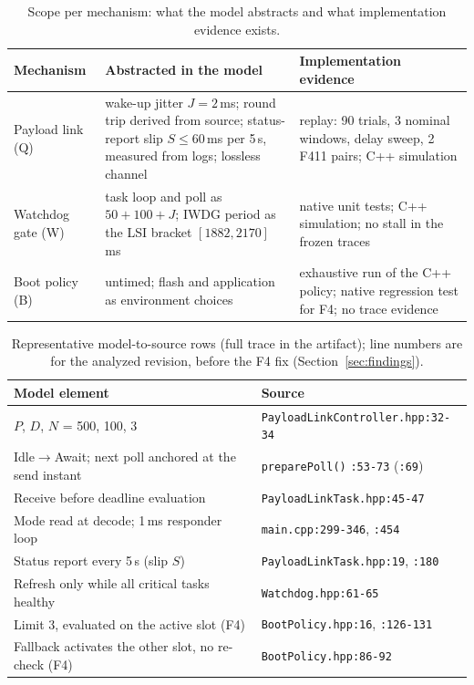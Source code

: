 \documentclass[conference,a4paper]{IEEEtran}
\newif\ifrerunmarks
\DeclareRobustCommand{\rerun}[1]{\ifrerunmarks\textcolor{red}{#1}\else#1\fi}
\begin{document}
\begin{table}[t]
\centering\footnotesize
\caption{Scope per mechanism: what the model abstracts and what implementation evidence exists.}
\label{tab:scope}
\setlength{\tabcolsep}{3.5pt}
\begin{tabularx}{\columnwidth}{@{}l >{\raggedright\arraybackslash}X >{\raggedright\arraybackslash}X@{}}
\toprule
Mechanism & Abstracted in the model & Implementation evidence \\
\midrule
Payload link (Q) & \rerun{wake-up jitter $J{=}2$\,ms; round trip derived from source; status-report slip $S{\le}60$\,ms per 5\,s, measured from logs}; lossless channel & replay: 90 trials, 3 nominal windows, delay sweep, 2 F411 pairs; C++ simulation \\
Watchdog gate (W) & task loop and poll as $50{+}100{+}J$; IWDG period as the LSI bracket $[1882,2170]$\,ms & native unit tests; C++ simulation; \rerun{no stall in the frozen traces} \\
Boot policy (B) & untimed; flash and application as environment choices & exhaustive run of the C++ policy; native regression test for F4; \rerun{no trace evidence} \\
\bottomrule
\end{tabularx}
\end{table}

\begin{table}[t]
\centering\footnotesize
\caption{Representative model-to-source rows (full trace in the artifact); line numbers are for the analyzed revision, before the F4 fix (Section~\ref{sec:findings}).}
\label{tab:trace}
\setlength{\tabcolsep}{3.5pt}
\begin{tabularx}{\columnwidth}{@{}>{\raggedright\arraybackslash}X l@{}}
\toprule
Model element & Source \\
\midrule
$P$, $D$, $N$ = 500, 100, 3 & \texttt{PayloadLinkController.hpp:32-34} \\
Idle$\to$Await; next poll anchored at the send instant & \texttt{preparePoll()} \texttt{:53-73} (\texttt{:69}) \\
Receive before deadline evaluation & \texttt{PayloadLinkTask.hpp:45-47} \\
Mode read at decode; 1\,ms responder loop & \texttt{main.cpp:299-346}, \texttt{:454} \\
Status report every 5\,s (slip $S$) & \texttt{PayloadLinkTask.hpp:19}, \texttt{:180} \\
Refresh only while all critical tasks healthy & \texttt{Watchdog.hpp:61-65} \\
Limit 3, evaluated on the active slot (F4) & \texttt{BootPolicy.hpp:16}, \texttt{:126-131} \\
Fallback activates the other slot, no re-check (F4) & \texttt{BootPolicy.hpp:86-92} \\
\bottomrule
\end{tabularx}
\end{table}
\end{document}
